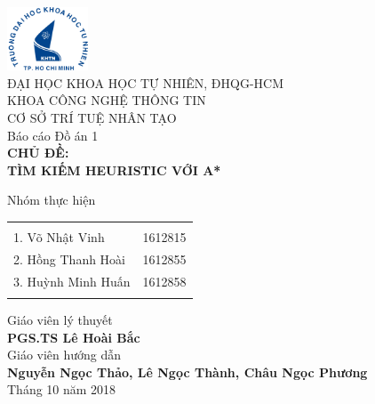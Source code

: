 \begin{titlepage}

\begin{center}

\includegraphics[width=0.18\textwidth]{hcmus.png}\\[0.1in]
\large{ĐẠI HỌC KHOA HỌC TỰ NHIÊN, ĐHQG-HCM\\KHOA CÔNG NGHỆ THÔNG TIN}\\
\normalsize
\vspace{4cm}
\textup{\large {CƠ SỞ TRÍ TUỆ NHÂN TẠO} \\ \Large Báo cáo Đồ án 1}\\[0.2in]

\huge \textbf {CHỦ ĐỀ:\\TÌM KIẾM HEURISTIC VỚI A*}\\[0.5in]
\vspace{4cm}



\normalsize Nhóm thực hiện \\
\begin{table}[h]
\centering
\begin{tabular}{lr}\hline \\
1. Võ Nhật Vinh & 1612815\\
2. Hồng Thanh Hoài & 1612855\\ 
3. Huỳnh Minh Huấn & 1612858\\ \\ \hline
\end{tabular}
\end{table}

\vspace{.2in}
Giáo viên lý thuyết\\
{\textbf{PGS.TS Lê Hoài Bắc}}\\[0.1in]
Giáo viên hướng dẫn\\
{\textbf{Nguyễn Ngọc Thảo, Lê Ngọc Thành, Châu Ngọc Phương}}\\[0.2in]

\vfill
Tháng 10 năm 2018

\end{center}

\end{titlepage}
\newpage